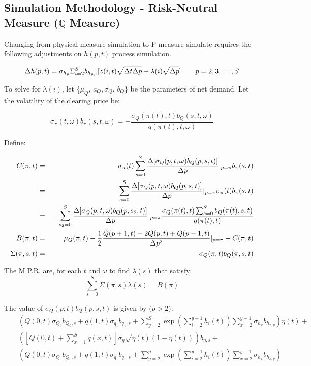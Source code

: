 \documentclass{article}
\begin{document}
\subsection{Simulation Methodology - Risk-Neutral Measure ($\mathbb{Q}$
Measure)}

Changing from physical measure simulation to P measure simulate requires the
following adjustments on $h(p,t)$ process simulation.

\begin{equation*}
\Delta h(p,t) = \sigma_{h_p} \Sigma_{i=2}^{S} b_{h_{p, i}} [z(i,t) \sqrt{%
\Delta t \Delta p} - \lambda(i)\sqrt{\Delta p}] \qquad p = 2, 3, \ldots, S
\end{equation*}

To solve for $\lambda(i)$, let \{$\mu _{Q}$, $a_{Q},\sigma _{Q}$, $b_{Q}\}$
be the parameters of net demand. Let the volatility of the clearing price be:

\begin{equation*}
\sigma _{\pi }(t,\omega )b_{\pi }(s,t,\omega )=-\frac{\sigma _{Q}(\pi
(t),t)b_{Q}(s,t,\omega )}{q(\pi (t),t,\omega )}
\end{equation*}
\bigskip

Define:

\begin{eqnarray*}
C(\pi ,t) &=&\sigma _{\pi }(t)\sum_{s=0}^{S}\frac{\Delta \lbrack
\sigma_{Q}(p,t,\omega )b_{Q}(p,s,t)]}{\Delta p}|_{p=\pi }b_{\pi }(s,t) \\
&=&\sum_{s=0}^{S}\frac{\Delta \lbrack \sigma _{Q}(p,t,\omega )b_{Q}(p,s,t)]}{%
\Delta p}|_{p=\pi }\sigma _{\pi }(t)b_{\pi }(s,t) \\
&=&-\sum_{s_{2}=0}^{S}\frac{\Delta \lbrack \sigma
_{Q}(p,t,\omega)b_{Q}(p,s_{2},t)]}{\Delta p}|_{p=\pi }\frac{\sigma
_{Q}(\pi(t),t)\sum_{s=0}^{S}b_{Q}(\pi (t),s,t)}{q(\pi (t),t)} \\
B(\pi ,t) &=&\mu _{Q}(\pi ,t)-\frac{1}{2}\frac{Q(p+1,t) - 2Q(p,t) + Q(p-1,t)%
}{\Delta p^{2}}|_{p=\pi }+C(\pi ,t) \\
\Sigma (\pi ,s,t) &=&\sigma _{Q}(\pi ,t)b_{Q}(\pi ,s,t)
\end{eqnarray*}
\bigskip

The M.P.R. are, for each $t$ and $\omega $ to find $\lambda (s)$ that
satisfy:%
\begin{equation*}
\sum_{s=0}^{S}\Sigma (\pi ,s)\lambda (s) = B(\pi )
\end{equation*}

The value of $\sigma _{Q}(p,t)b_{Q}(p,s,t)$ is given by ($p > 2$):%
\begin{eqnarray*}
&&\left( Q(0,t)\sigma _{Q_{0}}b_{Q_{0},s}+q(1,t)\sigma
_{q_{1}}b_{q_{1},s}+\sum_{y=2}^{S}\exp
(\sum_{i=2}^{y-1}h_{i}(t))\sum_{x=2}^{y-1}\sigma_{h_{x}}b_{h_{x,y}}\right)
\eta (t)+ \\
&&\left( [Q(0,t)+\sum_{x=1}^{S}q(x,t)]\sigma _{\eta }\sqrt{\eta (t)(1-\eta
(t))}\right) b_{\eta ,s}+ \\
&&\left(
Q(0,t)\sigma_{Q_{0}}b_{Q_{0},s}+q(1,t)\sigma_{q_{1}}b_{q_{1},s}+%
\sum_{y=2}^{p}\exp
(\sum_{i=2}^{y-1}h_{i}(t))\sum_{x=2}^{y-1}\sigma_{h_{x}}b_{h_{x,y}}\right)
\end{eqnarray*}
\end{document}
